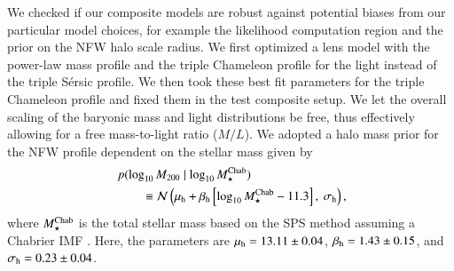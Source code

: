 \documentclass[longauth]{aa}
\begin{document}
We checked if our composite models are robust against potential biases from our particular model choices, for example the likelihood computation region and the prior on the NFW halo scale radius.  %
We first optimized a lens model with the power-law mass profile and the triple Chameleon profile for the light instead of the triple S\'ersic profile. We then took these best fit parameters for the triple Chameleon profile and fixed them in the test composite setup. We let the overall scaling of the baryonic mass and light distributions be free, thus effectively allowing for a free mass-to-light ratio ($M/L$). We adopted a halo mass prior for the NFW profile dependent on the stellar mass given by
%
\begin{equation} \label{eq:lenstronomy_halo_mass_prior}
        \begin{aligned}
        &p(\log_{10} M_{200} \mid \log_{10} M_{\star}^{\rm Chab}) \\\
        &\qquad \equiv \mathcal{N} \left(\mu_{\rm h} + \beta_{\rm h} \left[\log_{10} M_{\star}^{\rm Chab} - 11.3\right],\ \sigma_{\rm h} \right),
        \end{aligned}
\end{equation}
%
where $M_{\star}^{\rm Chab}$ is the total stellar mass based on the SPS method assuming a Chabrier IMF \citep{Sonnenfeld18c}. Here, the parameters are $\mu_{\rm h} = 13.11\pm0.04$, $\beta_{\rm h} = 1.43 \pm 0.15$, and $\sigma_{\rm h} = 0.23 \pm 0.04$.
%
\end{document}

